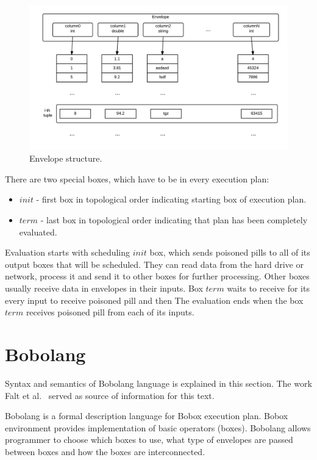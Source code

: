 \begin{figure}[h!]
  \centering
    \includegraphics[width=1\textwidth]{envelope}

      \caption{Envelope structure.}
          \label{fig:envelope}
\end{figure}
There are two special boxes, which have to be in every execution plan:
\begin{itemize}


\item $init$ - first box in topological order indicating starting box of execution plan.

\item $term$ - last box in topological order indicating that plan has been completely evaluated.

\end{itemize}

Evaluation starts with scheduling $init$ box, which sends poisoned pills to all of its output boxes that will be scheduled. They can read data from the hard drive or network, process it and send it to other boxes for further processing. Other boxes usually receive data in envelopes in their inputs. Box $term$ waits to receive for its every input to receive poisoned pill and then 
The evaluation ends when the box $term$ receives poisoned pill from each of its inputs.

\section{Bobolang}
Syntax and semantics of Bobolang language is explained in this section. The work Falt et al.~\cite{bobolang} served as source of information for this text.

Bobolang is a formal description language for Bobox execution plan. Bobox environment provides implementation of basic operators (boxes). Bobolang allows programmer to choose which boxes to use, what type of envelopes are passed between boxes and how the boxes are interconnected. 

